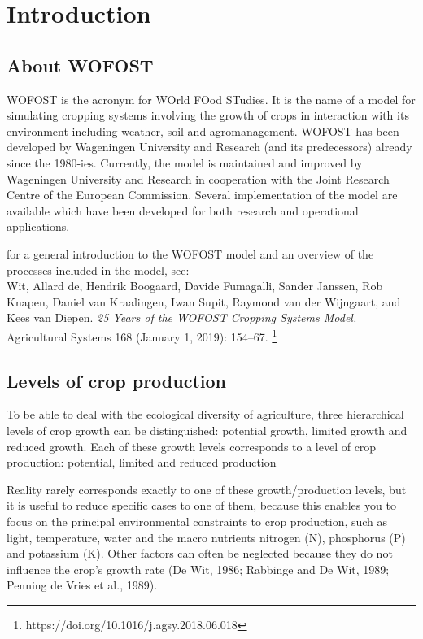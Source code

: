 
\chapter{Introduction} 

\section{About WOFOST}

WOFOST is the acronym for WOrld FOod STudies. It is the name of a model for
simulating cropping systems involving the growth of crops in interaction
with its environment including weather, soil and agromanagement. 
WOFOST has been developed by
Wageningen University and Research (and its predecessors) already
since the 1980-ies. Currently, the model is maintained and improved by Wageningen 
University and Research in cooperation with the Joint Research Centre of the European 
Commission. Several implementation of the model are available which have been
developed for both research and operational applications.

for a general introduction to the WOFOST model and an overview of the
processes included in the model, see:\\
Wit, Allard de, Hendrik Boogaard, Davide Fumagalli, Sander Janssen, Rob Knapen, 
Daniel van Kraalingen, Iwan Supit, Raymond van der Wijngaart, and Kees van Diepen. 
\textit{25 Years of the WOFOST Cropping Systems Model.} Agricultural Systems 168 
(January 1, 2019): 154–67. \footnote{https://doi.org/10.1016/j.agsy.2018.06.018}


\section{Levels of crop production}

To be able to deal with the ecological diversity of agriculture, three hierarchical levels of 
crop growth can be distinguished: potential growth, limited growth and reduced growth. 
Each of these growth levels corresponds to a level of crop production: potential, limited and 
reduced production

Reality rarely corresponds exactly to one of these growth/production levels, but it is 
useful to reduce specific cases to one of them, because this enables you to focus on the 
principal environmental constraints to crop production, such as light, temperature, 
water and the macro nutrients nitrogen (N), phosphorus (P) and potassium (K). Other 
factors can often be neglected because they do not influence the crop's growth rate 
(De Wit, 1986; Rabbinge and De Wit, 1989; Penning de Vries et al., 1989).

